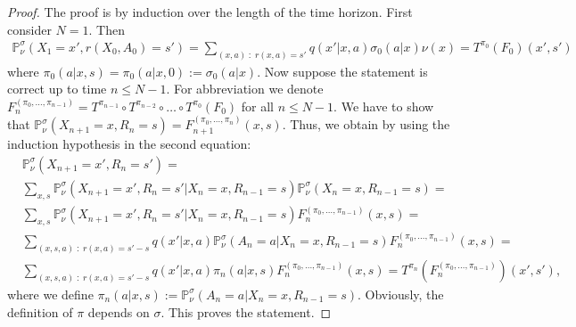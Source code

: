 \documentclass[reqno, 12pt]{amsart}%
\newcommand{\PP}{\mathbb{P}}
\theoremstyle{definition}
\numberwithin{equation}{section} \numberwithin{theorem}{section}
\begin{document}
\begin{proof}
The proof is by induction over the length of the 
time horizon. First consider $N=1.$ Then
\begin{align*}
\PP^\sigma_\nu(X_1=x', r(X_0,A_0)=s') = 
\sum_{(x,a)\; :\; r(x,a)=s'} q(x'|x,a) 
\sigma_0(a|x) \nu(x) = T^{\pi_0}(F_0)(x',s')  
\end{align*}
where $\pi_0(a|x,s)=\pi_0(a|x,0) := \sigma_0(a|x).  $
Now suppose the statement is correct up to time 
$n \le N-1.$ For abbreviation we denote 
$F_n^{(\pi_0,\ldots,\pi_{n-1})} = T^{\pi_{n-1}}\circ T^{\pi_{n-2}} \circ 
\ldots \circ T^{\pi_0}(F_0)$ for all $n\le N-1.$ 
We have to show that
$\PP^\sigma_\nu( X_{n+1}=x, R_{n}=s)= 
F_{n+1}^{(\pi_0,\ldots,\pi_{n})}(x,s)$. 
    Thus, we obtain by using the induction hypothesis in the second equation:
    \begin{align*}
      &\PP^\sigma_\nu(X_{n+1}=x', R_n=s') = \\
    &  \sum_{x,s}  \PP^\sigma_\nu(X_{n+1}=x', R_n=s' | X_n=x, R_{n-1}=s) \PP^\sigma_\nu( X_n=x, R_{n-1}=s) = \\
      & \sum_{x,s}  \PP^\sigma_\nu(X_{n+1}=x', R_n=s' | X_n=x, R_{n-1}=s) F_n^{(\pi_0,\ldots,\pi_{n-1})}(x,s)=\\
    & \sum_{(x,s,a)  \; :\; r(x,a)=s'-s}   q(x'|x,a) \PP^\sigma_\nu(A_{n}=a | X_n=x, R_{n-1}=s) F_n^{(\pi_0,\ldots,\pi_{n-1})}(x,s)=\\
      &  \sum_{(x,s,a) \; :\; r(x,a)=s'-s}q(x'|x,a)\pi_n(a|x,s) F_n^{(\pi_0,\ldots,\pi_{n-1})}(x,s)  =  T^{\pi_n}(F_n^{(\pi_0,\ldots,\pi_{n-1})})(x',s'),
    \end{align*}
   where we define $ \pi_n(a|x,s) := \PP^\sigma_\nu(A_{n}=a | X_n=x, R_{n-1}=s) $. Obviously, the definition of $\pi$ depends on $\sigma.$
   This proves the statement.
\end{proof}
\end{document}
